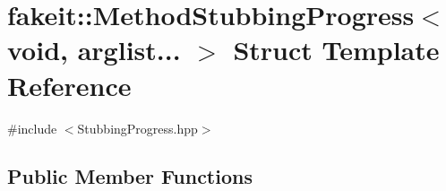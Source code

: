 \hypertarget{structfakeit_1_1MethodStubbingProgress_3_01void_00_01arglist_8_8_8_01_4}{}\section{fakeit\+::Method\+Stubbing\+Progress$<$ void, arglist... $>$ Struct Template Reference}
\label{structfakeit_1_1MethodStubbingProgress_3_01void_00_01arglist_8_8_8_01_4}


{\ttfamily \#include $<$Stubbing\+Progress.\+hpp$>$}

\subsection*{Public Member Functions}
